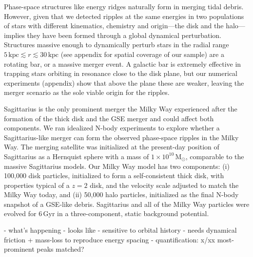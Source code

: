 \documentclass{natureprintstyle}
\newcommand{\msun}{\ensuremath{\textrm{M}_\odot}}
\newcommand{\kpc}{\ensuremath{\textrm{kpc}}}
\begin{document}
Phase-space structures like energy ridges naturally form in merging tidal debris\cite{gomez:2010, gomez:2012a, belokurov:2023}.
However, given that we detected ripples at the same energies in two populations of stars with different kinematics, chemistry and origin---the disk and the halo---implies they have been formed through a global dynamical perturbation.
Structures massive enough to dynamically perturb stars in the radial range $5\,\kpc\lesssim r \lesssim 30\,\kpc$ (see appendix for spatial coverage of our sample) are a rotating bar, or a massive merger event.
A galactic bar is extremely effective in trapping stars orbiting in resonance close to the disk plane\cite{dehnen:2000, trick:2021, dilamore:2023}, but our numerical experiments (appendix) show that above the plane these are weaker, leaving the merger scenario as the sole viable origin for the ripples.


Sagittarius is the only prominent merger the Milky Way experienced after the formation of the thick disk and the GSE merger and could affect both components\cite{ruiz-lara:2020, kruijssen:2020, bonaca:2020}.
We ran idealized N-body experiments to explore whether a Sagittarius-like merger can form the observed phase-space ripples in the Milky Way.
The merging satellite was initialized at the present-day position of Sagittarius\cite{vasiliev:2021} as a Hernquist sphere\cite{hernquist:1990} with a mass of $1\times10^{10}\,\msun$, comparable to the massive Sagittarius models\cite{laporte:2018}.
Our Milky Way model has two components: (i) 100,000 disk particles, initialized to form a self-consistent thick disk, with properties typical of a $z=2$ disk, and the velocity scale adjusted to match the Milky Way today, and (ii) 50,000 halo particles, initialized as the final N-body snapshot of a GSE-like debris\cite{naidu:2021}.
Sagittarius and all of the Milky Way particles were evolved for 6\,Gyr in a three-component, static background potential\cite{gala:2022}.

- what's happening
- looks like 
- sensitive to orbital history
- needs dynamical friction + mass-loss to reproduce energy spacing
- quantification: x/xx most-prominent peaks matched?

\end{document}
